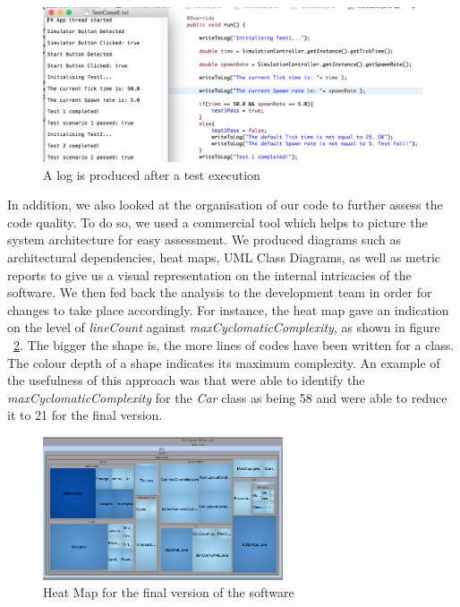 \begin{figure}[h]
        \begin{center}
                \includegraphics[width=\textwidth]{img/testCase.png}
                \caption{A log is produced after a test execution}
        \label{fig:testCase}
        \end{center}
\end{figure}

In addition, we also looked at the organisation of our code to further assess the code quality. To do so, we used a commercial tool which helps to picture the system architecture for easy assessment. We produced diagrams such as architectural dependencies, heat maps, UML Class Diagrams, as well as metric reports to give us a visual representation on the internal intricacies of the software. We then fed back the analysis to the development team in order for changes to take place accordingly. For instance, the heat map gave an indication on the level of \textit{lineCount} against \textit{maxCyclomaticComplexity}, as shown in figure ~\ref{fig:heatmap}. The bigger the shape is, the more lines of codes have been written for a class. The colour depth of a shape indicates its maximum complexity. An example of the usefulness of this approach was that were able to identify the \textit{maxCyclomaticComplexity} for the \textit{Car} class as being 58 and were able to reduce it to 21 for the final version.     

\begin{figure}[h]
        \begin{minipage}{\textwidth}
                \begin{center}
                                \includegraphics[width=71mm,keepaspectratio ]{img/heatmap.png}
                        \caption{Heat Map for the final version of the software}
                        \label{fig:heatmap}     
                \end{center}
        \end{minipage}
\end{figure}


